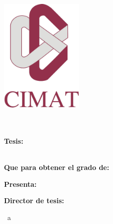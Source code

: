 \begin{titlepage}
    \begin{center}
        \includegraphics[width=4cm]{gfx/logo-big2} \\ \medskip    
        {\Large \myUni} \\ 
        \myDepartment \\                                           

        \hfill
        \vfill
        \large  
                
        \textbf{Tesis:}\\
        \begingroup
            \color{Maroon}\spacedallcaps{\myTitle} \\ \bigskip
        \endgroup
        \vspace{0.6cm}
        
        \textbf{Que para obtener el grado de:}\\
        \spacedlowsmallcaps{\myDegree} \vspace{1cm}

        \textbf{Presenta:}\\
        \spacedlowsmallcaps{\myName} \vspace{1cm}
        
        \textbf{Director de tesis:}\\
        \spacedlowsmallcaps{\myProf}

        \vfill
        \bigskip

        \vfill                      
        \myLocation ~a~ \myTime

    \end{center}  
\end{titlepage}   